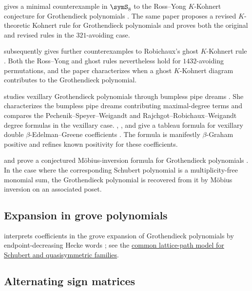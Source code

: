  gives a minimal counterexample in $\symS_8$ to the
Ross--Yong $K$-Kohnert conjecture for Grothendieck polynomials
\cite{Robichaux2024x}.  The same paper proposes a revised $K$-theoretic
Kohnert rule for Grothendieck polynomials and proves both the original and
revised rules in the $321$-avoiding case.

 subsequently gives further
counterexamples to Robichaux's ghost $K$-Kohnert rule
\cite{Dizier2026x}.  Both the Ross--Yong and ghost rules nevertheless hold
for $1432$-avoiding permutations, and the paper characterizes when a ghost
$K$-Kohnert diagram contributes to the Grothendieck polynomial.

 studies vexillary Grothendieck polynomials through
bumpless pipe dreams \cite{Hafner2022x}.  She characterizes the bumpless pipe
dreams contributing maximal-degree terms and compares the
Pechenik--Speyer--Weigandt and Rajchgot--Robichaux--Weigandt degree formulas in
the vexillary case.
, , and  give a
tableau formula for vexillary double $\beta$-Edelman--Greene coefficients
\cite{GregoryHamakerYu2024x}.  The formula is manifestly
$\beta$-Graham positive and refines known positivity for these coefficients.

 and  prove a conjectured
Möbius-inversion formula for Grothendieck polynomials
\cite{PechenikSatriano2024Mobius}.  In the case where the corresponding
Schubert polynomial is a multiplicity-free monomial sum, the Grothendieck
polynomial is recovered from it by Möbius inversion on an associated poset.



\subsection[grothendieckGroveExpansion]{Expansion in grove polynomials}

 interprets coefficients in the grove expansion of
Grothendieck polynomials by endpoint-decreasing Hecke words
\cite[Thm.~46]{Lee2026ForestPaths}; see the
\hyperref[equivariantQuasisymmetry]{common lattice-path model for Schubert
and quasisymmetric families}.

\subsection[grothendieckASM]{Alternating sign matrices}


